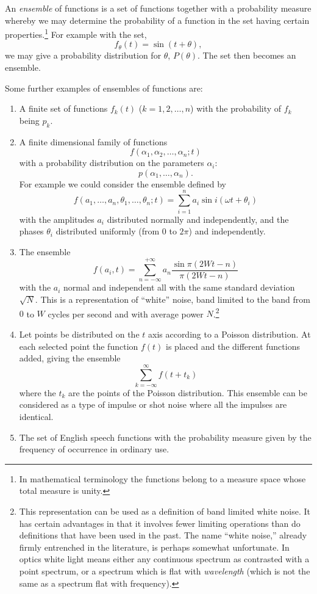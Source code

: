 An \emph{ensemble} of functions is a set of functions together with a
probability measure whereby we may determine the probability of a function
in the set having certain properties.\footnote{In mathematical terminology
the functions belong to a measure space whose total measure is unity.}  For
example with the set,
$$
f_\theta(t)=\sin(t+\theta),
$$
we may give a probability distribution for $\theta$, 
$P(\theta)$.  The set then becomes an ensemble.

Some further examples of ensembles of functions are:
\begin{enumerate}
\item
A finite set of functions $f_k(t)$ ($k=1,2,\dots,n$) with the probability
of $f_k$ being $p_k$.
\item
A finite dimensional family of functions
$$
f(\alpha_1,\alpha_2,\dots,\alpha_n;t)
$$
with a probability distribution on the parameters $\alpha_i$:
$$
p(\alpha_1,\dots,\alpha_n).
$$
For example we could consider the ensemble defined by
$$
f(a_1,\dots,a_n,\theta_1,\dots,\theta_n;t)
	=\sum_{i=1}^n a_i\sin i(\omega t+\theta_i)
$$
with the amplitudes $a_i$ distributed normally and independently, and the
phases $\theta_i$ distributed uniformly (from $0$ to $2\pi$) and
independently.

\item
\label{it:18.3}
The ensemble
$$
f(a_i,t)=\sum_{n=-\infty}^{+\infty} a_n\frac{\sin\pi(2W t-n)}{\pi(2W t-n)}
$$
with the $a_i$ normal and independent all with the same standard deviation
$\sqrt N$.  This is a representation of ``white'' noise, band limited to
the band from $0$ to $W$ cycles per second and with average power
$N$.\footnote{This representation can be used as a definition of band limited
white noise.  It has certain advantages in that it involves fewer limiting
operations than do definitions that have been used in the past.  The name
``white noise,'' already firmly entrenched in the literature, is perhaps
somewhat unfortunate.  In optics white light means either any continuous
spectrum as contrasted with a point spectrum, or a spectrum which is flat
with \emph{wavelength} (which is not the same as a spectrum flat with
frequency).}

\item
\label{it:18.4}
Let points be distributed on the $t$ axis according to a Poisson
distribution.  At each selected point the function $f(t)$ is placed and the
different functions added, giving the ensemble
$$
\sum_{k=-\infty}^\infty f(t+t_k)
$$
where the $t_k$ are the points of the Poisson distribution.  This ensemble
can be considered as a type of impulse or shot noise where all the impulses
are identical.

\item
\label{it:18.5}
The set of English speech functions with the probability measure given by
the frequency of occurrence in ordinary use.
\end{enumerate}

